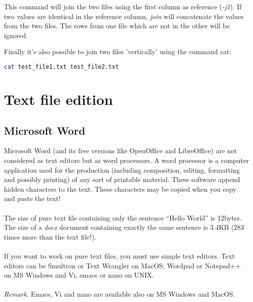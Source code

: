 \documentclass[two_sides]{my_article}
\begin{document}
This command will join the two files using the first column as reference (\emph{-j1}). If two values are identical in the reference column, \emph{join} will concatenate the values from the two files. The rows from one file which are not in the other will be ignored.

Finally it's also possible to join two files 'vertically' using the command cat:

\begin{lstlisting}[frame=lines, numbers=none, language=bash]
cat test_file1.txt test_file2.txt
\end{lstlisting}

\section{Text file edition}

\subsection{Microsoft Word}

Microsoft Word (and its free versions like OpenOffice and LibreOffice) are not considered as text editors but as word processors. A word processor is a computer application used for the production (including composition, editing, formatting and possibly printing) of any sort of printable material. These software append hidden characters to the text. These characters may be copied when you copy and paste the text! 
\paragraph{}
The size of pure text file containing only the sentence ``Hello World'' is 12bytes. The size of a \emph{docx} document containing exactly the same sentence is 3.4KB (283 times more than the text file!).
\paragraph{}
If you want to work on pure text files, you must use simple text editors.
Text editors can be Smultron or Text Wrangler on MacOS; Wordpad or Notepad++ on MS Windows and Vi, emacs or nano on UNIX. 

\paragraph{}
\emph{Remark}. Emacs, Vi and nano are available also on MS Windows and MacOS.
\end{document}
